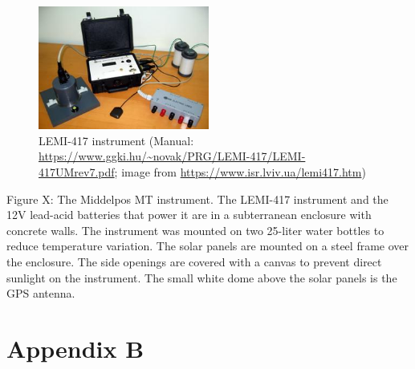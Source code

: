 \documentclass[draft,linenumbers]{agujournal2018}
\begin{document}
\begin{figure}[h]
  \centering
  \includegraphics[width=0.5\textwidth]{figures/LEMI-417.jpg}
  \caption{LEMI-417 instrument (Manual: \url{https://www.ggki.hu/~novak/PRG/LEMI-417/LEMI-417UMrev7.pdf}; image from \url{https://www.isr.lviv.ua/lemi417.htm})}
  \label{fig:lemi}
\end{figure}

Figure X: The Middelpos MT instrument. The LEMI-417 instrument and the 12V lead-acid batteries that power it are in a subterranean enclosure with concrete walls. The instrument was mounted on two 25-liter water bottles to reduce temperature variation. The solar panels are mounted on a steel frame over the enclosure. The side openings are covered with a canvas to prevent direct sunlight on the instrument. The small white dome above the solar panels is the GPS antenna.

\section{Appendix B}
\end{document}
